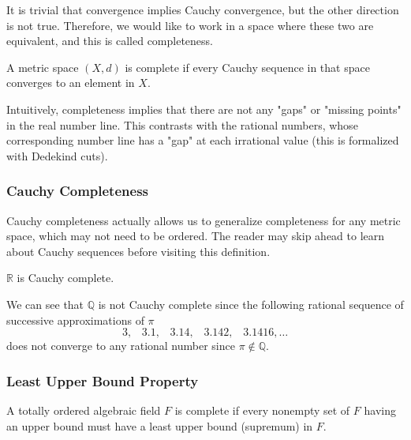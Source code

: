 \documentclass{article}
\begin{document}
      It is trivial that convergence implies Cauchy convergence, but the other direction is not true. Therefore, we would like to work in a space where these two are equivalent, and this is called completeness. 

      \begin{definition}[Completeness]
        A metric space $(X, d)$ is complete if every Cauchy sequence in that space converges to an element in $X$. 
      \end{definition} 

      Intuitively, completeness implies that there are not any "gaps" or "missing points" in the real number line. This contrasts with the rational numbers, whose corresponding number line has a "gap" at each irrational value (this is formalized with Dedekind cuts). 

      \subsubsection{Cauchy Completeness}

        Cauchy completeness actually allows us to generalize completeness for any metric space, which may not need to be ordered. The reader may skip ahead to learn about Cauchy sequences before visiting this definition. 

        \begin{lemma}
          $\mathbb{R}$ is Cauchy complete. 
        \end{lemma}

        We can see that $\mathbb{Q}$ is not Cauchy complete since the following rational sequence of successive approximations of $\pi$
        \begin{equation}
            3, \;\;\;3.1, \;\;\;3.14, \;\;\;3.142, \;\;\;3.1416, \ldots
        \end{equation}
        does not converge to any rational number since $\pi \not\in \mathbb{Q}$. 

      \subsubsection{Least Upper Bound Property}

        \begin{definition}
          A totally ordered algebraic field $F$ is complete if every nonempty set of $F$ having an upper bound must have a least upper bound (supremum) in $F$. 
        \end{definition}
\end{document}
